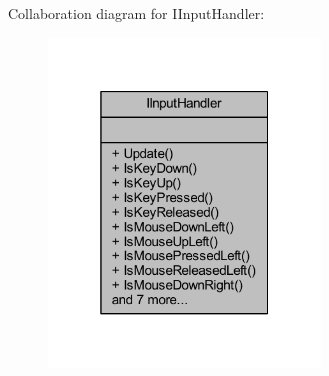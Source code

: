 Collaboration diagram for I\+Input\+Handler\+:\nopagebreak
\begin{figure}[H]
\begin{center}
\leavevmode
\includegraphics[width=205pt]{class_i_input_handler__coll__graph}
\end{center}
\end{figure}
